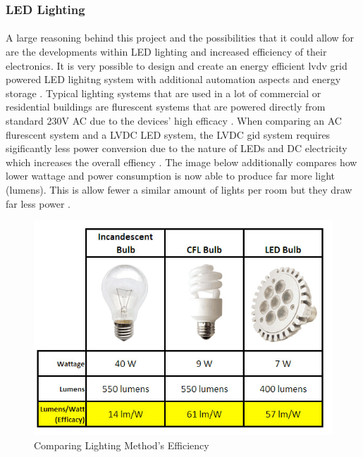 \subsubsection{LED Lighting}

\paragraph{}
A large reasoning behind this project and the possibilities that it could allow for are the developments within LED lighting and increased efficiency of their electronics. It is very possible to design and create an energy efficient lvdv grid powered LED lighitng system with additional automation aspects and energy storage \cite{Koh2011}. Typical lighting systems that are used in a lot of commercial or residential buildings are flurescent systems that are powered directly from standard 230V AC due to the devices' high efficacy \cite{Koh2011}. When comparing an AC flurescent system and a LVDC LED system, the LVDC gid system requires sigificantly less power conversion due to the nature of LEDs and DC electricity which increases the overall effiency \cite{Koh2011}. The image below additionally compares how lower wattage and power consumption is now able to produce far more light (lumens). This is allow fewer a similar amount of lights per room but they draw far less power \cite{website:LED}.  

\begin{figure}[H]
\hfill\includegraphics[width = 160mm]{images/LED_Comparison}\hspace*{\fill}
\caption{Comparing Lighting Method's Efficiency \cite{website:LED}}
\label{fig:EmergingTrends}
\end{figure}  

